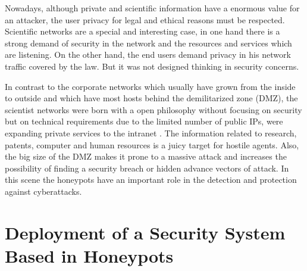 \documentclass[a4paper]{llncs}
\begin{document}
Nowadays, although private and scientific information have a enormous value for an attacker, the user privacy for legal and ethical reasons must be respected.
Scientific networks are a special and interesting case, in one hand there is a strong demand of security in the network and the resources and services which are listening. On the other hand, the end users demand privacy in his network traffic covered by the law. But it was not designed thinking in security concerns\cite{iris-proyecto}.

In contrast to the corporate networks which usually have grown from
the inside to outside and which have most hosts behind the demilitarized
zone (DMZ), the scientist networks were born with a open philosophy without focusing on security but on technical requirements due to the limited number of public IPs, were expanding private services to the intranet \cite{iris-proyecto}. The information related to research, patents, computer and human resources is a juicy target for hostile agents. Also, the big size of the DMZ makes it prone to a massive attack and increases the possibility of finding a security breach or hidden advance vectors of attack. In this scene the honeypots have an important role in the detection and protection against cyberattacks. 

\section{Deployment of a Security System Based in Honeypots}
\end{document}
